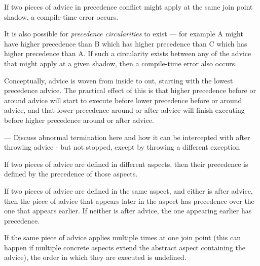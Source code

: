 \documentclass[12pt,a4paper]{report}
\begin{document}
If two pieces of advice in precedence conflict might apply at the same
join point shadow, a compile-time error occurs.

It is also possible for {\em precedence circularities} to exist --- for example
A might have higher precedence than B which has higher precedence than C
which has higher precedence than A. If such a circularity exists between
any of the advice that might apply at a given shadow, then a compile-time
error also occurs.

Conceptually, advice is woven from inside to out, starting with the lowest
precedence advice. The practical effect of this is that higher precedence
before or around advice will start to execute before lower precedence before
or around advice, and that lower precedence around or after advice will 
finish executing before higher precedence around or after advice. 

--- Discuss abnormal termination here and how it can be intercepted with
after throwing advice - but not stopped, except by throwing a different
exception

If two pieces of advice are defined 
in different aspects, then their precedence is defined by the precedence
of those aspects.

If two pieces of advice are defined in the same aspect, and either is after
advice, then the piece of advice that appears later in the aspect has 
precedence over the one that appears earlier. If neither is after advice,
the one appearing earlier has precedence.

If the same piece of advice applies multiple times at one join point
(this can happen if multiple concrete aspects extend the abstract aspect
containing the advice), the order in which they are executed is undefined.
\end{document}
